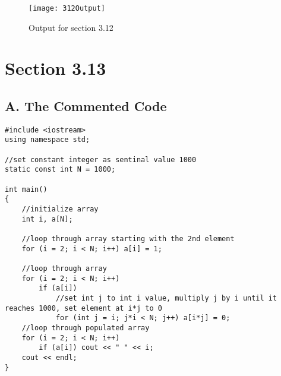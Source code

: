 \documentclass[11pt]{article}
\begin{document}
\begin{figure}[h]
    \centering
    \texttt{[image: 312Output]}
    \caption{Output for section 3.12}
    \label{fig:my_label}
\end{figure}

\section*{Section 3.13}
\subsection*{A. The Commented Code}
\begin{lstlisting}
#include <iostream>
using namespace std;

//set constant integer as sentinal value 1000
static const int N = 1000;

int main()
{
    //initialize array
    int i, a[N];
    
    //loop through array starting with the 2nd element
    for (i = 2; i < N; i++) a[i] = 1;
    
    //loop through array
    for (i = 2; i < N; i++)
        if (a[i])
            //set int j to int i value, multiply j by i until it reaches 1000, set element at i*j to 0
            for (int j = i; j*i < N; j++) a[i*j] = 0;
    //loop through populated array
    for (i = 2; i < N; i++)
        if (a[i]) cout << " " << i;
    cout << endl;
}
\end{lstlisting}
\end{document}
